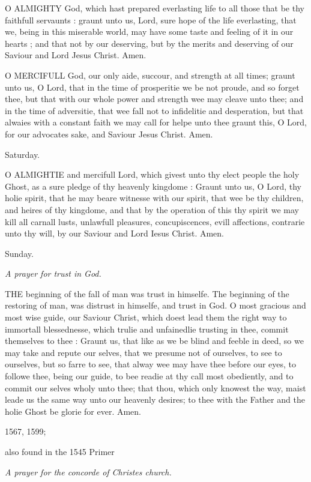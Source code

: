 O
ALMIGHTY God, which hast prepared everlasting life to all those that be
thy faithfull servaunts : graunt unto us, Lord, sure hope of the life
everlasting, that we, being in this miserable world, may have some taste
and feeling of it in our hearts ; and that not by our deserving, but by
the merits and deserving of our Saviour and Lord Jesus Christ. Amen.

O
MERCIFULL God, our only aide, succour, and strength at all times; graunt
unto us, O Lord, that in the time of prosperitie we be not proude, and
so forget thee, but that with our whole power and strength wee may cleave
unto thee; and in the time of adversitie, that wee fall not to infidelitie
and desperation, but that alwaies with a constant faith we may call for
helpe unto thee graunt this, O Lord, for our advocates sake, and Saviour
Jesus Christ. Amen.

Saturday.

O
ALMIGHTIE and mercifull Lord, which givest unto thy elect people the holy
Ghost, as a sure pledge of thy heavenly kingdome : Graunt unto us, O Lord,
thy holie spirit, that he may beare witnesse with our spirit, that wee
be thy children, and heires of thy kingdome, and that by the operation
of this thy spirit we may kill all carnall lusts, unlawfull pleasures,
concupiscences, evill affections, contrarie unto thy will, by our Saviour
and Lord Iesus Christ. Amen.

Sunday.

\emph{A
prayer for trust in God.}

THE
beginning of the fall of man was trust in himselfe. The beginning of the
restoring of man, was distrust in himselfe, and trust in God. O most gracious
and most wise guide, our Saviour Christ, which doest lead them the right
way to immortall blessednesse, which trulie and unfainedlie trusting in
thee, commit themselves to thee : Graunt us, that like as we be blind
and feeble in deed, so we may take and repute our selves, that we presume
not of ourselves, to see to ourselves, but so farre to see, that alway
wee may have thee before our eyes, to followe thee, being our guide, to
bee readie at thy call most obediently, and to commit our selves wholy
unto thee; that thou, which only knowest the way, maist leade us the same
way unto our heavenly desires; to thee with the Father and the holie Ghost
be glorie for ever. Amen.

1567,
1599;

also found in the 1545 Primer

\emph{A
prayer for the concorde of Christes church.}

